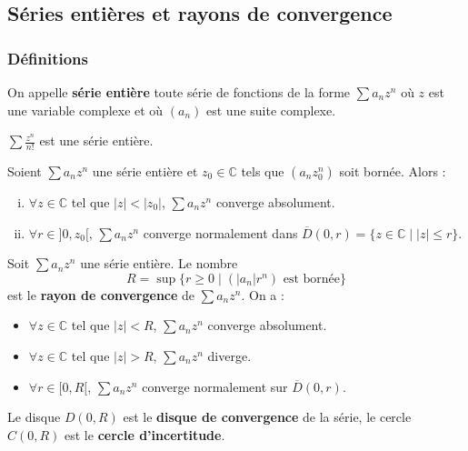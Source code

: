 




	\subsection{Séries entières et rayons de convergence}

	\subsubsection{Définitions}


	\begin{definition}
		On appelle \textbf{série entière} toute série de fonctions de la forme $\sum a_n z^n$ où $z$ est une variable complexe et où $(a_n)$ est une suite complexe.
	\end{definition}

	\begin{example}
		$\sum \frac{z^n}{n!}$ est une série entière.
	\end{example}

	\begin{lemma}[Abel]
		Soient $\sum a_n z^n$ une série entière et $z_0 \in \mathbb{C}$ tels que $(a_n z_0^n)$ soit bornée. Alors :
		\begin{enumerate}[(i)]
			\item $\forall z \in \mathbb{C}$ tel que $|z| < |z_0|$, $\sum a_n z^n$ converge absolument.
			\item $\forall r \in ]0,z_0[, \, \sum a_n z^n$ converge normalement dans $\overline{D}(0, r) = \{ z \in \mathbb{C} \mid |z| \leq r \}$.
		\end{enumerate}
	\end{lemma}

	\begin{definition}
		Soit $\sum a_n z^n$ une série entière. Le nombre
		\[ R = \sup \{ r \geq 0 \mid (|a_n|r^n) \text{ est bornée} \} \]
		est le \textbf{rayon de convergence} de $\sum a_n z^n$. On a :
		\begin{itemize}
			\item $\forall z \in \mathbb{C}$ tel que $|z| < R$, $\sum a_n z^n$ converge absolument.
			\item $\forall z \in \mathbb{C}$ tel que $|z| > R$, $\sum a_n z^n$ diverge.
			\item $\forall r \in [0,R[$, $\sum a_n z^n$ converge normalement sur $\overline{D}(0,r)$.
		\end{itemize}
		Le disque $D(0,R)$ est le \textbf{disque de convergence} de la série, le cercle $C(0,R)$ est le \textbf{cercle d'incertitude}.
	\end{definition}

